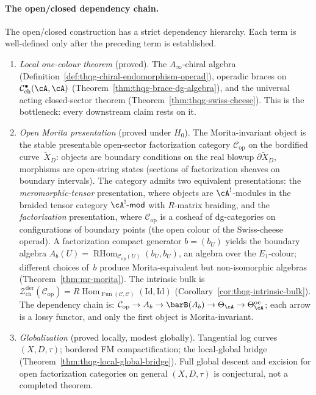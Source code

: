 \paragraph{The open/closed dependency chain.}
\label{par:concordance-four-stage-architecture}
The open/closed construction has a strict dependency hierarchy.
Each term is well-defined only after the preceding term is
established.
\begin{enumerate}[label=\textup{(\arabic*)}, leftmargin=3.5em]
\item \emph{Local one-colour theorem} (proved).
 The $A_\infty$-chiral algebra
 (Definition~\ref{def:thqg-chiral-endomorphism-operad}),
 operadic braces on
 $\mathcal{C}^\bullet_{\mathrm{ch}}(\cA, \cA)$
 (Theorem~\ref{thm:thqg-brace-dg-algebra}),
 and the universal acting closed-sector theorem
 (Theorem~\ref{thm:thqg-swiss-cheese}).
 This is the bottleneck: every downstream claim rests on it.

\item \emph{Open Morita presentation} (proved under $H_0$).
 The Morita-invariant object is the stable presentable open-sector
 factorization category $\mathcal{C}_{\mathrm{op}}$
 on the bordified curve~$\widetilde{X}_D$:
 objects are boundary conditions on the real blowup
 $\partial\widetilde{X}_D$, morphisms are open-string
 states (sections of factorization sheaves on boundary
 intervals).
 The category admits two equivalent presentations:
 the \emph{meromorphic-tensor} presentation, where
 objects are $\cA^!$-modules in the braided tensor category
 $\cA^!\text{-}\mathsf{mod}$ with $R$-matrix braiding, and
 the \emph{factorization} presentation, where
 $\mathcal{C}_{\mathrm{op}}$ is a cosheaf of dg-categories
 on configurations of boundary points (the open colour of
 the Swiss-cheese operad).
 A factorization compact generator $b=(b_U)$
 yields the boundary algebra
 $A_b(U)=\operatorname{RHom}_{\mathcal{C}_{\mathrm{op}}(U)}(b_U,b_U)$,
 an algebra over the $E_1$-colour; different choices of~$b$
 produce Morita-equivalent but non-isomorphic algebras
 (Theorem~\ref{thm:mr-morita}).
 The intrinsic bulk is
 $\mathcal{Z}^{\mathrm{der}}_{\mathrm{ch}}(\mathcal{C}_{\mathrm{op}})
 = R\!\operatorname{Hom}_{\operatorname{Fun}(\mathcal{C},\mathcal{C})}
 (\mathrm{Id}, \mathrm{Id})$
 (Corollary~\ref{cor:thqg-intrinsic-bulk}).
 The dependency chain is:
 $\mathcal{C}_{\mathrm{op}} \to A_b \to
 \barB(A_b) \to \Theta_\cA \to \Theta^{\mathrm{oc}}_\cA$;
 each arrow is a lossy functor, and only the first object
 is Morita-invariant.

\item \emph{Globalization} (proved locally, modest globally).
 Tangential log curves $(X, D, \tau)$; bordered FM compactification;
 the local-global bridge
 (Theorem~\ref{thm:thqg-local-global-bridge}).
 Full global descent and excision for open factorization categories on
 general $(X, D, \tau)$ is conjectural, not a completed theorem.


\end{enumerate}
